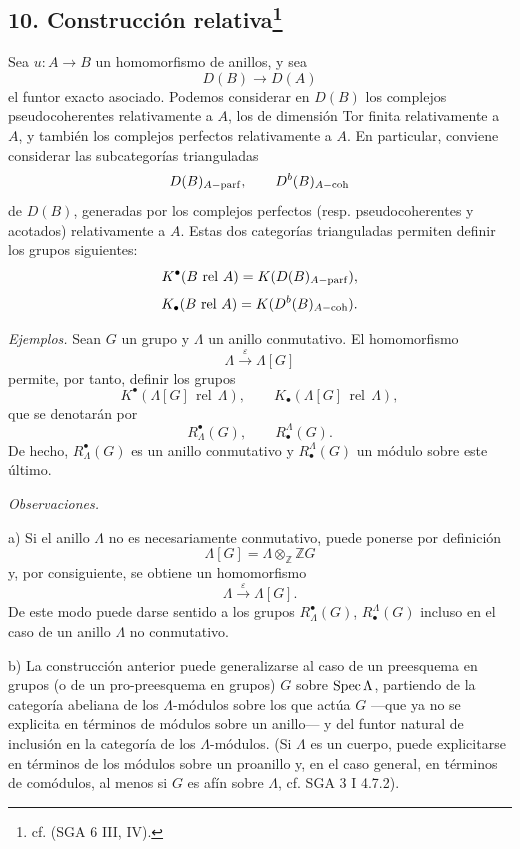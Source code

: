\subsection*{10. Construcción relativa\footnote{cf. (SGA 6 III, IV).}}

Sea $u:A\to B$ un homomorfismo de anillos, y sea
\[
D(B)\longrightarrow D(A)
\]
el funtor exacto asociado. Podemos considerar en $D(B)$ los complejos pseudocoherentes relativamente a $A$, los de dimensión Tor finita relativamente a $A$, y también los complejos perfectos relativamente a $A$. En particular, conviene considerar las subcategorías trianguladas
\[
D(B)_{A-\mathrm{parf}},\qquad D^b(B)_{A-\mathrm{coh}}
\]
de $D(B)$, generadas por los complejos perfectos (resp. pseudocoherentes y acotados) relativamente a $A$. Estas dos categorías trianguladas permiten definir los grupos siguientes:
\[
K^{\bullet}(B\operatorname{\,rel\,}A)=K(D(B)_{A-\mathrm{parf}}),
\]
\[
K_\bullet(B\operatorname{\,rel\,}A)=K(D^b(B)_{A-\mathrm{coh}}).
\]

\emph{Ejemplos.} Sean $G$ un grupo y $\Lambda$ un anillo conmutativo. El homomorfismo
\[
\Lambda\xrightarrow{\varepsilon}\Lambda[G]
\]
permite, por tanto, definir los grupos
\[
K^{\bullet}(\Lambda[G]\operatorname{\,rel\,}\Lambda),\qquad
K_\bullet(\Lambda[G]\operatorname{\,rel\,}\Lambda),
\]
que se denotarán por
\[
R^{\bullet}_\Lambda(G),\qquad R^\Lambda_\bullet(G).
\]
De hecho, $R^{\bullet}_\Lambda(G)$ es un anillo conmutativo y $R^\Lambda_\bullet(G)$ un módulo sobre este último.

\emph{Observaciones.}

a) Si el anillo $\Lambda$ no es necesariamente conmutativo, puede ponerse por definición
\[
\Lambda[G]=\Lambda\otimes_{\mathbb Z}\mathbb ZG
\]
y, por consiguiente, se obtiene un homomorfismo
\[
\Lambda\xrightarrow{\varepsilon}\Lambda[G].
\]
De este modo puede darse sentido a los grupos $R^{\bullet}_\Lambda(G)$, $R^\Lambda_\bullet(G)$ incluso en el caso de un anillo $\Lambda$ no conmutativo.

b) La construcción anterior puede generalizarse al caso de un preesquema en grupos (o de un pro-preesquema en grupos) $G$ sobre $\operatorname{Spec}\Lambda$, partiendo de la categoría abeliana de los $\Lambda$-módulos sobre los que actúa $G$ ---que ya no se explicita en términos de módulos sobre un anillo--- y del funtor natural de inclusión en la categoría de los $\Lambda$-módulos. (Si $\Lambda$ es un cuerpo, puede explicitarse en términos de los módulos sobre un proanillo y, en el caso general, en términos de comódulos, al menos si $G$ es afín sobre $\Lambda$, cf. SGA 3 I 4.7.2).
